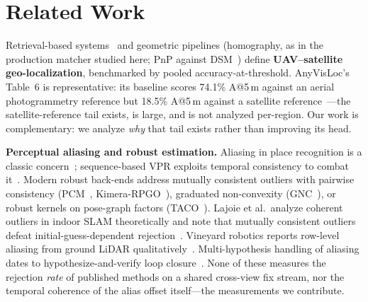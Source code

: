 \documentclass[journal]{IEEEtran}
\begin{document}
\section{Related Work}

{\sloppy
Retrieval-based systems~\cite{uavvisloc,anyvisloc,denseuav} and geometric pipelines (homography, as in the production matcher studied here; PnP against DSM~\cite{ortholoc,orthotrack}) define \textbf{UAV--satellite geo-localization}, benchmarked by pooled accuracy-at-threshold. AnyVisLoc's Table~6 is representative: its baseline scores 74.1\% A@5\,m against an aerial photogrammetry reference but 18.5\% A@5\,m against a satellite reference~\cite{anyvisloc}---the satellite-reference tail exists, is large, and is not analyzed per-region. Our work is complementary: we analyze \emph{why} that tail exists rather than improving its head.\par}

\textbf{Perceptual aliasing and robust estimation.} Aliasing in place recognition is a classic concern~\cite{lowry2016}; sequence-based VPR exploits temporal consistency to combat it~\cite{seqvpr}. Modern robust back-ends address mutually consistent outliers with pairwise consistency (PCM~\cite{mangelson2018}, Kimera-RPGO~\cite{kimera}), graduated non-convexity (GNC~\cite{yang2020}), or robust kernels on pose-graph factors (TACO~\cite{taco}). Lajoie et al.\ analyze coherent outliers in indoor SLAM theoretically and note that mutually consistent outliers defeat initial-guess-dependent rejection~\cite{lajoie2019}. Vineyard robotics reports row-level aliasing from ground LiDAR qualitatively~\cite{desilva2025,desilva2026,vineptmap}. Multi-hypothesis handling of aliasing dates to hypothesize-and-verify loop closure~\cite{tanaka2016}. None of these measures the rejection \emph{rate} of published methods on a shared cross-view fix stream, nor the temporal coherence of the alias offset itself---the measurements we contribute.
\end{document}
